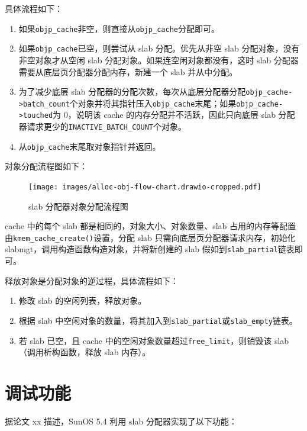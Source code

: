 \documentclass[AutoFakeBold]{LZUThesis}
\begin{document}
\begin{sloppypar}
具体流程如下：

\begin{enumerate}
\def\labelenumi{\arabic{enumi}.}
\item
  如果\texttt{objp\_cache}非空，则直接从\texttt{objp\_cache}分配即可。
\item
  如果\texttt{objp\_cache}已空，则尝试从 slab 分配。优先从非空 slab
  分配对象，没有非空对象才从空闲 slab
  分配对象。如果连空闲对象都没有，这时 slab
  分配器需要从底层页分配器分配内存，新建一个 slab 并从中分配。
\item
  为了减少底层 slab
  分配器的分配次数，每次从底层分配器分配\texttt{objp\_cache-\textgreater{}batch\_count}个对象并将其指针压入\texttt{objp\_cache}末尾；如果\texttt{objp\_cache-\textgreater{}touched}为
  0，说明该 cache 的内存分配并不活跃，因此只向底层 slab
  分配器请求更少的\texttt{INACTIVE\_BATCH\_COUNT}个对象。
\item
  从\texttt{objp\_cache}末尾取对象指针并返回。
\end{enumerate}

对象分配流程图如下：

\begin{figure}
\centering
\texttt{[image: images/alloc-obj-flow-chart.drawio-cropped.pdf]}
\caption{slab 分配器对象分配流程图}
\end{figure}

cache 中的每个 slab 都是相同的，对象大小、对象数量、slab
占用的内存等配置由\texttt{kmem\_cache\_create()}设置，分配 slab
只需向底层页分配器请求内存，初始化
slabmgt，调用构造函数构造对象，并将新创建的 slab
假如到\texttt{slab\_partial}链表即可。

释放对象是分配对象的逆过程，具体流程如下：

\begin{enumerate}
\def\labelenumi{\arabic{enumi}.}
\item
  修改 slab 的空闲列表，释放对象。
\item
  根据 slab
  中空闲对象的数量，将其加入到\texttt{slab\_partial}或\texttt{slab\_empty}链表。
\item
  若 slab 已空，且 cache
  中的空闲对象数量超过\texttt{free\_limit}，则销毁该
  slab（调用析构函数，释放 slab 内存）。
\end{enumerate}


\section{调试功能}

据论文 xx 描述，SunOS 5.4 利用 slab 分配器实现了以下功能：


\end{sloppypar}
\end{document}
